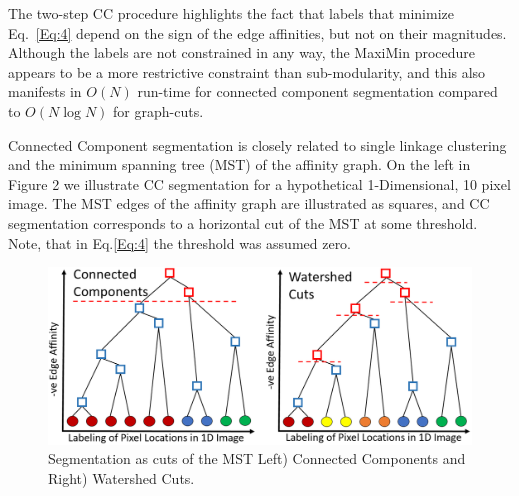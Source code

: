 \documentclass[letterpaper,twocolumn,fleqn]{article}
\begin{document}
The two-step CC procedure highlights the fact that labels that minimize Eq.~\ref{Eq:4} depend on the sign of the edge affinities, but not on their magnitudes. Although the labels are not constrained in any way, the MaxiMin procedure appears to be a more restrictive constraint than sub-modularity, and this also manifests in $O(N)$ run-time for connected component segmentation  compared to $O(N\log N)$ for graph-cuts\cite{Schmidt2009}. 

Connected Component segmentation is closely related to single linkage clustering and the minimum spanning tree (MST) of the affinity graph. On the left in Figure 2 we illustrate CC segmentation for a hypothetical 1-Dimensional, 10 pixel image. The MST edges of the affinity graph are illustrated as squares, and CC segmentation corresponds to a horizontal cut of the MST at some threshold. Note, that in Eq.\ref{Eq:4} the threshold was assumed zero. 

\begin{figure}[h]
    \centering
    \includegraphics[height = 0.15\textheight]{cc_ws_tree.png}
    \caption{Segmentation as cuts of the MST Left) Connected Components and Right) Watershed Cuts.}
    \label{fig:inferning_threshold}
\end{figure}
\end{document}
